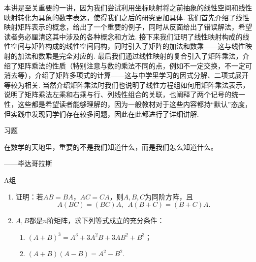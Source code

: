 本讲是至关重要的一讲，因为我们尝试利用坐标映射将之前抽象的线性空间和线性映射转化为具象的数字表达，使得我们之后的研究更加具体. 我们首先介绍了线性映射矩阵表示的概念，给出了一个重要的例子，同时从反面给出了错误解法，希望读者务必厘清这其中涉及的各种概念和方法. 接下来我们证明了线性映射构成的线性空间与矩阵构成的线性空间同构，同时引入了矩阵的加法和数乘——这与线性映射的加法和数乘是完全对应的. 最后我们通过线性映射的复合引入了矩阵乘法，介绍了矩阵乘法的性质（特别注意与数的乘法不同的点，例如不一定交换，不一定可消去等），介绍了矩阵多项式的计算——这与中学里学习的因式分解、二项式展开等较为相关. 当然介绍矩阵乘法时我们也说明了线性方程组如何用矩阵乘法表示，说明了矩阵乘法左乘和右乘与行、列线性组合的关联，也阐释了两个记号的统一性，这些都是希望读者能够理解的，因为一般教材对于这些内容都持``默认''态度，但实践中发现同学们存在较多问题，因此在此都进行了详细讲解.

\vspace{2ex}
\centerline{\heiti \Large 习题}

\vspace{2ex}
{\kaishu 在数学的天地里，重要的不是我们知道什么，而是我们怎么知道什么。}
\begin{flushright}
    \kaishu
    ——毕达哥拉斯
\end{flushright}

\centerline{\heiti A组}
\begin{enumerate}
    \item 证明：若$AB=BA$，$AC=CA$，则$A,B,C$为同阶方阵，且
          \[A(BC)=(BC)A,\enspace A(B+C)=(B+C)A.\]

    \item $A,B$都是$n$阶矩阵，求下列等式成立的充分条件：
          \begin{enumerate}
              \item $(A+B)^3=A^3+3A^2B+3AB^2+B^3$；

              \item $(A+B)(A-B)=A^2-B^2$.
          \end{enumerate}
\end{enumerate}

